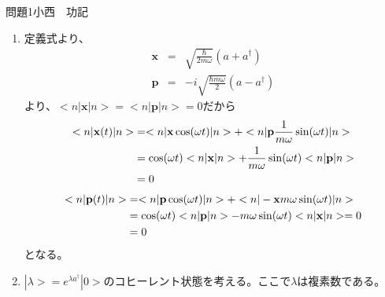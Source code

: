 \documentclass[fleqn]{jbook}
\begin{document}
\begin{answer}{問題1}{小西　功記}
\begin{enumerate}

\item 
定義式より、
\begin{eqnarray}
\mathbf{x}&=&\sqrt{\frac{\hbar}{2m\omega}}(a+a^\dag)\\
\mathbf{p}&=&-i\sqrt{\frac{\hbar m\omega}{2}}(a-a^\dag)
\end{eqnarray}
より、$<n|\mathbf{x}|n>=<n|\mathbf{p}|n>=0$だから
\begin{align}
<n|\mathbf{x}(t)|n>&=<n|\mathbf{x}\cos(\omega t)|n>+<n|\mathbf{p}\frac{1}{m\omega}\sin(\omega t)|n>\notag\\
		&=\cos(\omega t)<n|\mathbf{x}|n>+\frac{1}{m\omega}\sin(\omega t)<n|\mathbf{p}|n>\\
		&=0
\end{align}
\begin{align}
<n|\mathbf{p}(t)|n>&=<n|\mathbf{p}\cos(\omega t)|n>+<n|-\mathbf{x}m\omega\sin(\omega t)|n>\notag\\
		&=\cos(\omega t)<n|\mathbf{p}|n>-m\omega\sin(\omega t)<n|\mathbf{x}|n>=0\\
		&=0
\end{align}
となる。


\item
$|\lambda>=e^{\lambda a^\dag}|0>$のコヒーレント状態を考える。ここで$\lambda$は複素数である。


\end{enumerate}
\end{answer}
\end{document}
